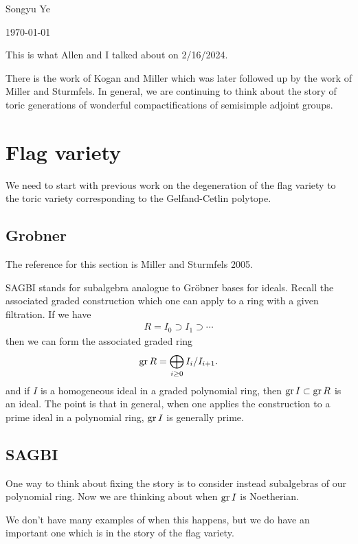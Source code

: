 \documentclass[12pt]{article}
\begin{document}
Songyu Ye

\today

\hfill

This is what Allen and I talked about on 2/16/2024.

\hfill

There is the work of Kogan and Miller which was later followed up by the work of Miller 
and Sturmfels. In general, we are continuing to think about the story of 
toric generations of wonderful compactifications of semisimple adjoint groups.

\section{Flag variety}

We need to start with previous work on the degeneration
of the flag variety to the toric variety corresponding to the Gelfand-Cetlin polytope.


\subsection{Grobner}
The reference for this section is Miller and Sturmfels 2005.

\hfill

SAGBI stands for subalgebra analogue to Gröbner bases for ideals. Recall 
the associated graded construction which one can apply to a ring with a given filtration.
If we have \begin{align*}
    R = I_0 \supset I_1 \supset \cdots
\end{align*} then we can form the associated graded ring \begin{align*}
    \operatorname{gr} R = \bigoplus_{i \geq 0} I_i/I_{i+1}.
\end{align*} and if $I$ is a homogeneous ideal in a graded 
polynomial ring, then $\operatorname{gr} I\subset \operatorname{gr} R$
is an ideal. The point is that in general, when one applies the construction 
to a prime ideal in a polynomial ring, $\operatorname{gr} I$ is generally prime. 
\subsection{SAGBI}
One way to think about fixing the story is to consider instead subalgebras
of our polynomial ring. Now we are thinking about when $\operatorname{gr} I$ is Noetherian.

\hfill

We don't have many examples of when this happens, but we do have an important one
which is in the story of the flag variety.
\end{document}
